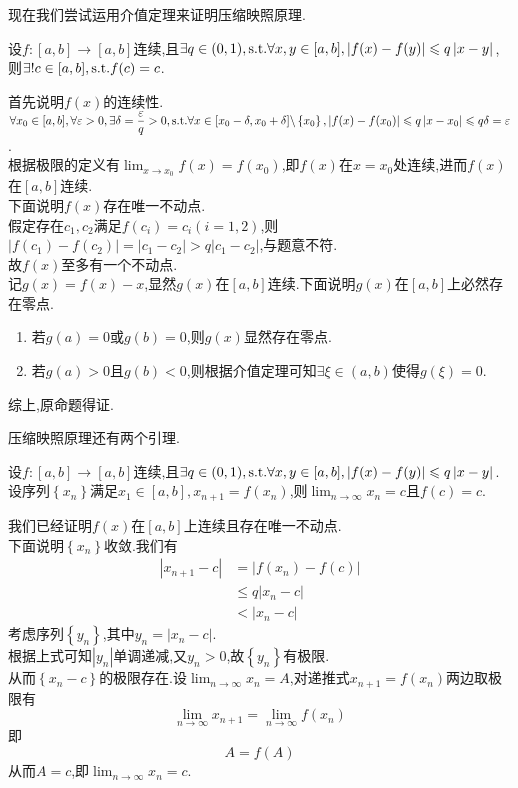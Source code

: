 \documentclass{ctexart}
\begin{document}
现在我们尝试运用介值定理来证明压缩映照原理.
\begin{formal}[压缩映照原理]
    设$f:[a,b]\to[a,b]$连续,且$\exists q\in(0,1),\text{s.t.}\forall x,y\in[a,b],\left\lvert f(x)-f(y)\right\rvert\leqslant q\left\lvert x-y\right\rvert$,
    则$\exists!c\in[a,b],\text{s.t.} f(c)=c$.
\end{formal}
\begin{solution}[Proof.]
    首先说明$f(x)$的连续性.\\
    $\forall x_0\in [a,b],\forall \varepsilon>0,\exists \delta=\dfrac{\varepsilon}{q}>0,\text{s.t.}
    \forall x\in[x_0-\delta,x_0+\delta]\backslash\left\{x_0\right\},
    \left\lvert f(x)-f(x_0)\right\rvert\leqslant q\left\lvert x-x_0\right\rvert\leqslant q\delta=\varepsilon$.\\
    根据极限的定义有$\lim_{x\to x_0}{f(x)}=f(x_0)$,即$f(x)$在$x=x_0$处连续,进而$f(x)$在$[a,b]$连续.\\
    下面说明$f(x)$存在唯一不动点.\\
    假定存在$c_1,c_2$满足$f(c_i)=c_i(i=1,2)$,则
    $\left\lvert f(c_1)-f(c_2)\right\rvert=\left\lvert c_1-c_2\right\rvert >q\left\lvert c_1-c_2\right\rvert$,与题意不符.\\
    故$f(x)$至多有一个不动点.\\
    记$g(x)=f(x)-x$,显然$g(x)$在$[a,b]$连续.下面说明$g(x)$在$[a,b]$上必然存在零点.
    \begin{enumerate}[label=(\arabic*)]
        \item 若$g(a)=0$或$g(b)=0$,则$g(x)$显然存在零点.
        \item 若$g(a)>0$且$g(b)<0$,则根据介值定理可知$\exists\xi\in(a,b)$使得$g(\xi)=0$.
    \end{enumerate}
    综上,原命题得证.
\end{solution}\noindent
压缩映照原理还有两个引理.
\begin{formal}[Lemma 1]
    设$f:[a,b]\to[a,b]$连续,且$\exists q\in(0,1),\text{s.t.}\forall x,y\in[a,b],\left\lvert f(x)-f(y)\right\rvert\leqslant q\left\lvert x-y\right\rvert$.\\
    设序列$\left\{ x_n\right\}$满足$x_1\in[a,b],x_{n+1}=f(x_n)$,则$\displaystyle\lim_{n\to\infty}{x_n}=c$且$f(c)=c$.
\end{formal}
\begin{solution}[Proof.]
    我们已经证明$f(x)$在$[a,b]$上连续且存在唯一不动点.\\
    下面说明$\left\{ x_n\right\}$收敛.我们有
    $$\begin{aligned}
        \left|x_{n+1}-c\right| 
        &= \left|f(x_n)-f(c)\right| \\
        &\leqslant q\left|x_n-c\right| \\
        &< \left|x_n-c\right|
    \end{aligned}$$
    考虑序列$\left\{ y_n\right\}$,其中$y_n=\left|x_n-c\right|$.\\
    根据上式可知$\left| y_n\right|$单调递减,又$y_n>0$,故$\left\{ y_n\right\}$有极限.\\
    从而$\left\{x_n-c\right\}$的极限存在.设$\displaystyle\lim_{n\to\infty}{x_n}=A$,对递推式$x_{n+1}=f(x_n)$两边取极限有
    $$\lim_{n\to\infty}{x_{n+1}}=\lim_{n\to\infty}{f(x_n)}$$
    即$$A=f(A)$$
    从而$A=c$,即$\displaystyle\lim_{n\to\infty}{x_n}=c.$
\end{solution}
\end{document}
